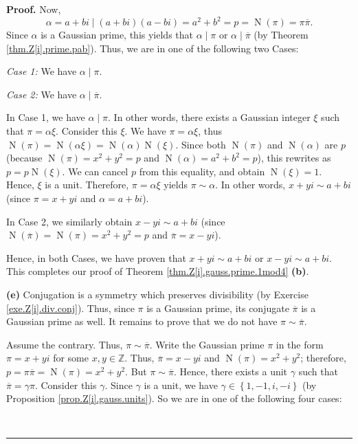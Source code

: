 \documentclass[numbers=enddot,12pt,final,onecolumn,notitlepage]{scrartcl}%
\numberwithin{exer}{subsection}
\theoremstyle{definition}
\newenvironment{proof}[1][Proof]{\noindent\textbf{#1.} }{\ \rule{0.5em}{0.5em}}
\begin{document}
\begin{proof}
Now,
\[
\alpha=a+bi\mid\left(  a+bi\right)  \left(  a-bi\right)  =a^{2}+b^{2}%
=p=\operatorname*{N}\left(  \pi\right)  =\pi\overline{\pi}.
\]
Since $\alpha$ is a Gaussian prime, this yields that $\alpha\mid\pi$ or
$\alpha\mid\overline{\pi}$ (by Theorem \ref{thm.Z[i].prime.pab}). Thus, we are
in one of the following two Cases:

\textit{Case 1:} We have $\alpha\mid\pi$.

\textit{Case 2:} We have $\alpha\mid\overline{\pi}$.

In Case 1, we have $\alpha\mid\pi$. In other words, there exists a Gaussian
integer $\xi$ such that $\pi=\alpha\xi$. Consider this $\xi$. We have
$\pi=\alpha\xi$, thus $\operatorname*{N}\left(  \pi\right)  =\operatorname*{N}%
\left(  \alpha\xi\right)  =\operatorname*{N}\left(  \alpha\right)
\operatorname*{N}\left(  \xi\right)  $. Since both $\operatorname*{N}\left(
\pi\right)  $ and $\operatorname*{N}\left(  \alpha\right)  $ are $p$ (because
$\operatorname*{N}\left(  \pi\right)  =x^{2}+y^{2}=p$ and $\operatorname*{N}%
\left(  \alpha\right)  =a^{2}+b^{2}=p$), this rewrites as
$p=p\operatorname*{N}\left(  \xi\right)  $. We can cancel $p$ from this
equality, and obtain $\operatorname*{N}\left(  \xi\right)  =1$. Hence, $\xi$
is a unit. Therefore, $\pi=\alpha\xi$ yields $\pi\sim\alpha$. In other words,
$x+yi\sim a+bi$ (since $\pi=x+yi$ and $\alpha=a+bi$).

In Case 2, we similarly obtain $x-yi\sim a+bi$ (since $\operatorname*{N}%
\left(  \overline{\pi}\right)  =\operatorname*{N}\left(  \pi\right)
=x^{2}+y^{2}=p$ and $\overline{\pi}=x-yi$).

Hence, in both Cases, we have proven that $x+yi\sim a+bi$ or $x-yi\sim a+bi$.
This completes our proof of Theorem \ref{thm.Z[i].gauss.prime.1mod4}
\textbf{(b)}.

\textbf{(e)} Conjugation is a symmetry which preserves divisibility (by
Exercise \ref{exe.Z[i].div.conj}). Thus, since $\pi$ is a Gaussian prime, its
conjugate $\overline{\pi}$ is a Gaussian prime as well. It remains to prove
that we do not have $\pi\sim\overline{\pi}$.

Assume the contrary. Thus, $\pi\sim\overline{\pi}$. Write the Gaussian prime
$\pi$ in the form $\pi=x+yi$ for some $x,y\in\mathbb{Z}$. Thus, $\overline
{\pi}=x-yi$ and $\operatorname*{N}\left(  \pi\right)  =x^{2}+y^{2}$;
therefore, $p=\pi\overline{\pi}=\operatorname*{N}\left(  \pi\right)
=x^{2}+y^{2}$. But $\pi\sim\overline{\pi}$. Hence, there exists a unit
$\gamma$ such that $\overline{\pi}=\gamma\pi$. Consider this $\gamma$. Since
$\gamma$ is a unit, we have $\gamma\in\left\{  1,-1,i,-i\right\}  $ (by
Proposition \ref{prop.Z[i].gauss.units}). So we are in one of the following
four cases:


\end{proof}
\end{document}
